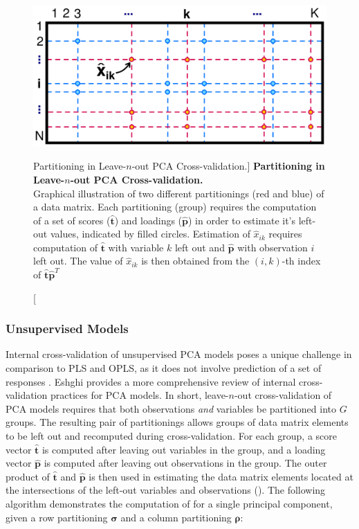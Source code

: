 \begin{figure}[h!]
\begin{center}
  \includegraphics[width=4.5in]{figs/mva/16-pcacv.png}
\end{center}
\caption
      [Partitioning in Leave-$n$-out PCA Cross-validation.]{
  {\bf Partitioning in Leave-$n$-out PCA Cross-validation.}
  \\
  Graphical illustration of two different partitionings (red and blue) of a
  data matrix. Each partitioning (group) requires the computation of a set of
  scores ($\hat{\mathbf{t}}$) and loadings ($\hat{\mathbf{p}}$) in order to
  estimate it's left-out values, indicated by filled circles. Estimation of
  $\hat{x}_{ik}$ requires computation of $\hat{\mathbf{t}}$ with variable $k$
  left out and $\hat{\mathbf{p}}$ with observation $i$ left out. The value of
  $\hat{x}_{ik}$ is then obtained from the $(i,k)$-th index of
  $\hat{\mathbf{t}} \hat{\mathbf{p}}^T$
}
\label{figure.3.16}
\end{figure}

\subsubsection{Unsupervised Models}

\begin{doublespace}
Internal cross-validation of unsupervised PCA models poses a unique challenge
in comparison to PLS and OPLS, as it does not involve prediction of a set of
responses \cite{eastment:tech1982,krzanowski:biom1987,eshghi:cils2014}. Eshghi
\cite{eshghi:cils2014} provides a more comprehensive review of internal
cross-validation practices for PCA models. In short, leave-$n$-out
cross-validation of PCA models requires that both observations \emph{and}
variables be partitioned into $G$ groups. The resulting pair of partitionings
allows groups of data matrix elements to be left out and recomputed during
cross-validation. For each group, a score vector $\hat{\mathbf{t}}$ is
computed after leaving out variables in the group, and a loading vector
$\hat{\mathbf{p}}$ is computed after leaving out observations in the group.
The outer product of $\hat{\mathbf{t}}$ and $\hat{\mathbf{p}}$ is then used
in estimating the data matrix elements located at the intersections of the
left-out variables and observations (). The
following algorithm demonstrates the computation of \qsq{} for a single
principal component, given a row partitioning $\boldsymbol{\sigma}$ and
a column partitioning $\boldsymbol{\rho}$:
\end{doublespace}

